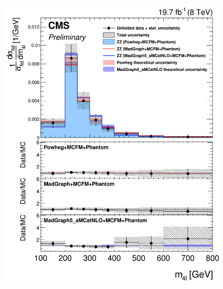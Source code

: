 \begin{figure}[hbtp]
\begin{center}
    \includegraphics[width=\cmsFigWidth]{Figures/DiffCrossSecZZTo4eMass_Unfolded_fr_Powheg_norm.png}     

\end{center}
\end{figure}

